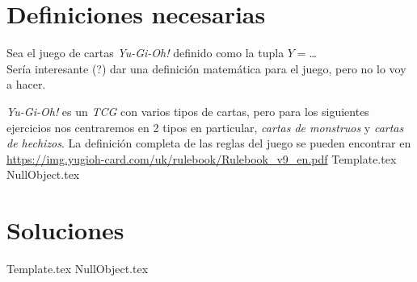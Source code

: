 \section{Definiciones necesarias}
  Sea el juego de cartas \textit{Yu-Gi-Oh!} definido como la tupla 
  $Y = $\dots\\
  Sería interesante (?) dar una definición matemática para el juego, pero no lo voy a 
  hacer.

  \textit{Yu-Gi-Oh!} es un \textit{TCG} con varios tipos de cartas, pero para los 
  siguientes ejercicios nos centraremos en 2 tipos en particular, \textit{cartas de 
  monstruos} y \textit{cartas de hechizos}.
  La definición completa de las reglas del juego se pueden encontrar en 
  \url{https://img.yugioh-card.com/uk/rulebook/Rulebook_v9_en.pdf}
%
{Template.tex} 
{NullObject.tex}

\section{Soluciones}
  {Template.tex}
  {NullObject.tex}
%